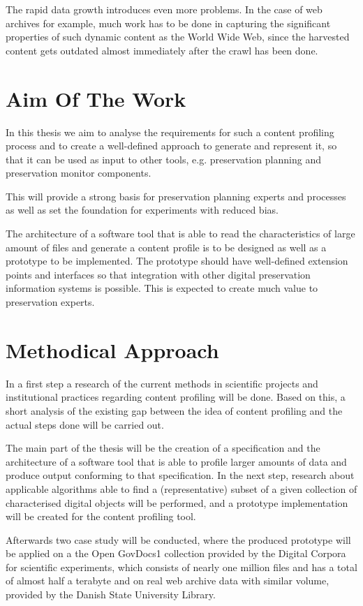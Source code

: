 The rapid data growth introduces even more problems.
In the case of web archives for example, much work has to be done in capturing the significant properties of such dynamic content as the World Wide Web, since the harvested content gets outdated almost immediately after the crawl has been done.

\section{Aim Of The Work}
\label{sec:aim_of_the_work}
In this thesis we aim to analyse the requirements for such a content profiling process and to create a well-defined approach to generate and represent it, so that it can be used as input to other tools, e.g. preservation planning and preservation monitor components.

This will provide a strong basis for preservation planning experts and processes as well as set the foundation for experiments with reduced bias.

The architecture of a software tool that is able to read the characteristics of large amount of files and generate a content
profile is to be designed as well as a prototype to be implemented.
The prototype should have well-defined extension points and interfaces so that integration with other digital preservation information systems is possible.
This is expected to create much value to preservation experts.

\section{Methodical Approach}
\label{sec:methodical_approach}
In a first step a research of the current methods in scientific projects and institutional practices regarding content profiling will be done.
Based on this, a short analysis of the existing gap between the idea of content profiling and the actual steps done will be carried out. 

The main part of the thesis will be the creation of a specification and the architecture of a software tool that is able to profile larger amounts of data and produce output conforming to that specification. In the next step, research about applicable algorithms able to find a (representative) subset of a given collection of characterised digital objects will be performed, and a prototype implementation will be created for the content profiling tool. 

Afterwards two case study will be conducted, where the produced prototype will be applied on a the Open GovDocs1 collection provided by the Digital Corpora for scientific experiments, which consists of nearly one million files and has a total of almost half a terabyte and on real web archive data with similar volume, provided by the Danish State University Library. 

